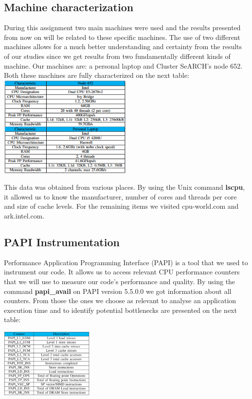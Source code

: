 \documentclass[journal]{IEEEtran}
\begin{document}
\subsection{Machine characterization}
During this assignment two main machines were used and the 
results presented from now on will be related to these 
specific machines. The use of two different machines allows 
for a much better understanding and certainty from the 
results of our studies since we get results from two 
fundamentally different kinds of machine. Our machines are: 
a personal laptop and Cluster SeARCH's node 652. Both these 
machines are fully characterized on the next table:\\
\includegraphics[width=0.5\textwidth]{comps.png}

This data was obtained from various places. By using the Unix command \textbf{lscpu}, it allowed us to know the manufacturer, number of cores and threads per core and size of cache levels. For the remaining items we visited cpu-world.com and ark.intel.com.

\subsection{PAPI Instrumentation}
Performance Application Programming Interface (PAPI) is a tool that we used to instrument our code. It allows us to access relevant CPU performance counters that we will use to measure our code's performance and quality. By using the command \textbf{papi\_avail} on PAPI version 5.5.0.0 we got information about all counters. From those the ones we choose as relevant to analyse an application execution time and to identify potential bottlenecks are presented on the next table:

\includegraphics[width=0.35\textwidth]{paps.png}
\end{document}
